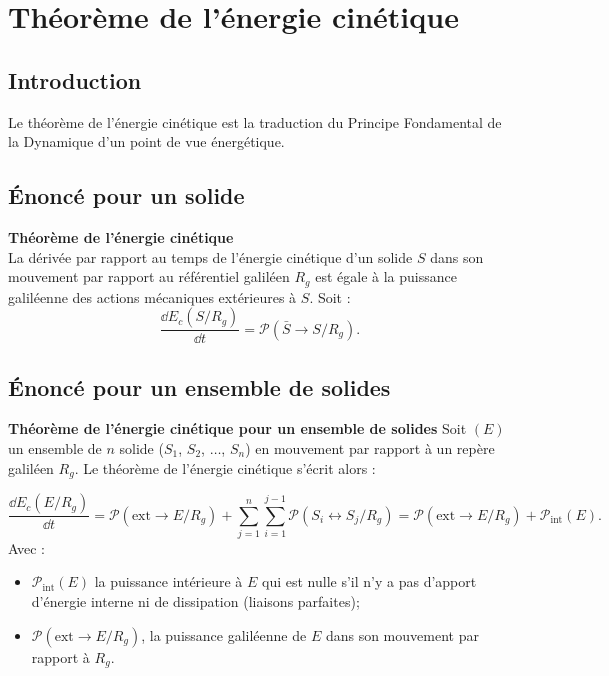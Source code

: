 \section{Théorème de l'énergie cinétique}
\subsection{Introduction}
Le théorème de l'énergie cinétique est la traduction du Principe Fondamental de la Dynamique d'un point de vue énergétique.
\subsection{Énoncé pour un solide}

\begin{theorem}\textbf{Théorème de l'énergie cinétique} \\
La dérivée par rapport au temps de l'énergie cinétique d'un solide $S$ dans son mouvement par rapport au référentiel galiléen $R_g$ est égale à la puissance galiléenne des actions mécaniques extérieures à $S$.
Soit :
$$
\dfrac{\dd E_c(S/R_g)}{\dd t}=\mathcal{P}(\bar S \rightarrow S/R_g).
$$

\end{theorem}


%


\subsection{Énoncé pour un ensemble de solides}

\begin{theorem}\textbf{Théorème de l'énergie cinétique pour un ensemble de solides}
Soit $(E)$ un ensemble de $n$ solide ($S_1$, $S_2$, $\ldots$, $S_n$) en mouvement par rapport à un repère galiléen $R_g$. Le théorème de l'énergie cinétique s'écrit alors :

$$
\frac{\dd E_c(E/R_g)}{\dd t}=\mathcal{P}(\text{ext}\rightarrow E/R_g)+ \displaystyle{\sum^n_{j=1}}\displaystyle{\sum^{j-1}_{i=1}}\mathcal{P}(S_i \leftrightarrow S_j/R_g)=\mathcal{P}(\text{ext}\rightarrow E/R_g)+\mathcal{P}_{\text{int}}(E).
$$
Avec :
\begin{itemize}
\item $\mathcal{P}_{\text{int}}(E)$ la puissance intérieure à $E$ qui est nulle s'il n'y a pas d'apport d'énergie interne ni de dissipation (liaisons parfaites);
\item $\mathcal{P}(\text{ext}\rightarrow E/R_g)$, la puissance galiléenne de $E$ dans son mouvement par rapport à $R_g$.
\end{itemize}

\end{theorem}

